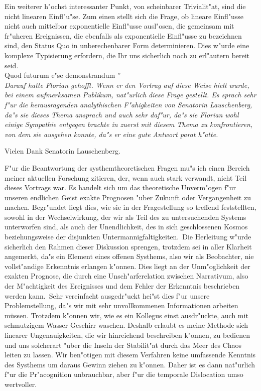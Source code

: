 \documentclass[a5paper,8pt]{book}
\begin{document}
Ein weiterer h"ochst interessanter Punkt, von scheinbarer Trivialit"at, sind die nicht linearen Einfl"u"se. Zum einen stellt sich die Frage, ob lineare Einfl"usse nicht auch 
mittelbar exponentielle Einfl"usse ausl"osen, die gemeinsam mit fr"uheren Ereignissen, die ebenfalls als exponentielle Einfl"usse zu bezeichnen sind, den Status Quo in 
unberechenbarer Form determinieren. Dies w"urde eine komplexe Typisierung erfordern, die Ihr uns sicherlich noch zu erl"autern bereit seid.\\

Quod futurum e"se demonstrandum ''\\

\textit{Darauf hatte Florian gehofft. Wenn er den Vortrag auf diese Weise hielt wurde, bei einem aufmerksamen Publikum, nat"urlich diese Frage gestellt. Es sprach sehr f"ur 
die herausragenden analythischen F"ahigkeiten von Senatorin Lauschenberg, da"s sie dieses Thema ansprach und auch sehr daf"ur, da"s sie Florian wohl einige Sympathie entgegen 
brachte in zuerst mit diesem Thema zu konfrontieren, von dem sie ausgehen konnte, da"s er eine gute Antwort parat h"atte.}

\grqq Vielen Dank Senatorin Lauschenberg.

F"ur die Beantwortung der systhemtheoretischen Fragen mu"s ich einen Bereich meiner aktuellen Forschung zitieren, der, wenn auch stark verwandt, nicht Teil dieses Vortrags war. 
Es handelt sich um das theoretische Unverm"ogen f"ur unseren endlichen Geist exakte Prognosen "uber Zukunft oder Vergangenheit zu machen. Begr"undet liegt dies, wie sie in der 
Fragestellung so treffend feststellten, sowohl in der Wechselwirkung, der wir als Teil des zu untersuchenden Systems unterworfen sind, als auch der Unendlichkeit, des in sich 
geschlossenen Kosmos beziehungsweise der disjunkten Untermannigfaltigkeiten.\
Die Herleitung w"urde sicherlich den Rahmen dieser Diskussion sprengen, trotzdem sei in aller Klarheit angemerkt, da"s ein Element eines offenen Systhems, also wir als 
Beobachter, nie vollst"andige Erkenntnis erlangen k"onnen. Dies liegt an der Unm"oglichkeit der exakten Prognose, die durch eine Unsch"arferelation zwischen Narrativum, also 
der \grqq M"achtigkeit \grqq des Ereignisses und dem Fehler der Erkenntnis beschrieben werden kann.\
Sehr vereinfacht ausgedr"uckt hei"st dies f"ur unsere Problemstellung, da"s wir mit sehr unvollkommenen Informationen arbeiten müssen. Trotzdem k"onnen wir, wie es ein 
Kollegus einst ausdr"uckte, auch mit schmutzigem Wasser Geschirr waschen. Deshalb erlaubt es meine Methode sich linearer Ungenauigkeiten, die wir hinreichend beschreiben 
k"onnen, zu bedienen und uns solcherart "uber die Inseln der Stabilit"at durch das Meer des Chaos leiten zu lassen. Wir ben"otigen mit diesem Verfahren keine umfassende 
Kenntnis des Systhems um daraus Gewinn ziehen zu k"onnen. Daher ist es dann nat"urlich f"ur die Pr"acognition unbrauchbar, aber f"ur die temporale Dislocation umso wertvoller.\\
\end{document}
